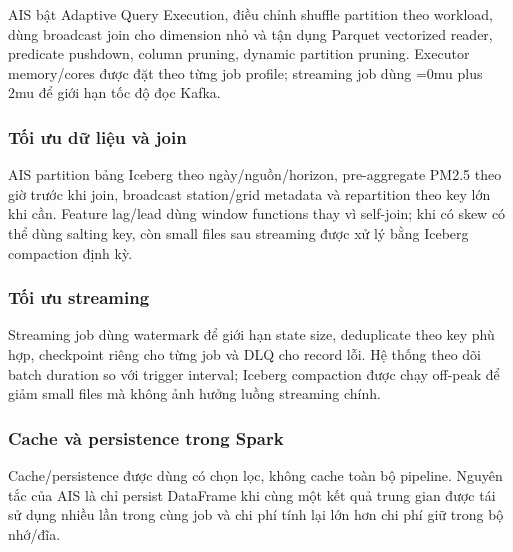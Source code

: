 \documentclass[12pt,a4paper]{article}
\newcommand{\code}[1]{\begingroup\Urlmuskip=0mu plus 2mu\path{#1}\endgroup}
\begin{document}
AIS bật Adaptive Query Execution, điều chỉnh shuffle partition theo workload, dùng broadcast join cho dimension nhỏ và tận dụng Parquet vectorized reader, predicate pushdown, column pruning, dynamic partition pruning. Executor memory/cores được đặt theo từng job profile; streaming job dùng \code{maxOffsetsPerTrigger} để giới hạn tốc độ đọc Kafka.

\subsubsection{Tối ưu dữ liệu và join}\label{tux1ed1i-ux1b0u-dux1eef-liux1ec7u-vuxe0-join}

AIS partition bảng Iceberg theo ngày/nguồn/horizon, pre-aggregate PM2.5 theo giờ trước khi join, broadcast station/grid metadata và repartition theo key lớn khi cần. Feature lag/lead dùng window functions thay vì self-join; khi có skew có thể dùng salting key, còn small files sau streaming được xử lý bằng Iceberg compaction định kỳ.

\subsubsection{Tối ưu streaming}\label{tux1ed1i-ux1b0u-streaming}

Streaming job dùng watermark để giới hạn state size, deduplicate theo key phù hợp, checkpoint riêng cho từng job và DLQ cho record lỗi. Hệ thống theo dõi batch duration so với trigger interval; Iceberg compaction được chạy off-peak để giảm small files mà không ảnh hưởng luồng streaming chính.

\subsubsection{Cache và persistence trong Spark}\label{cache-vuxe0-persistence-trong-spark}

Cache/persistence được dùng có chọn lọc, không cache toàn bộ pipeline. Nguyên tắc của AIS là chỉ persist DataFrame khi cùng một kết quả trung gian được tái sử dụng nhiều lần trong cùng job và chi phí tính lại lớn hơn chi phí giữ trong bộ nhớ/đĩa.
\end{document}
